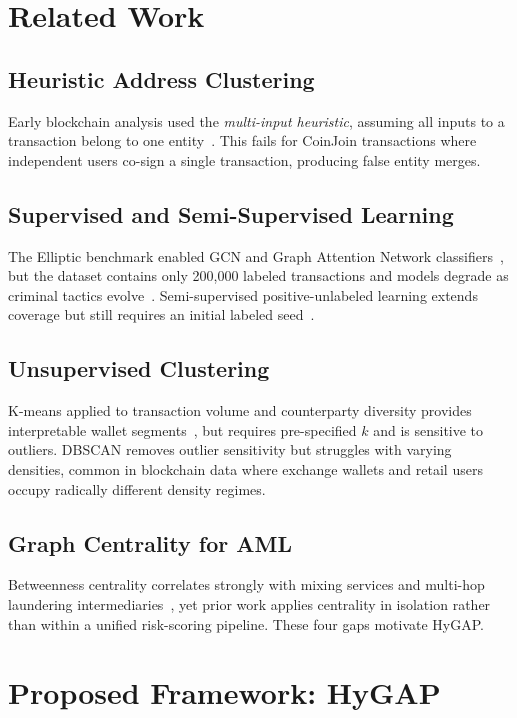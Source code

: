 \documentclass[conference]{IEEEtran}
\begin{document}
\section{Related Work}

\subsection{Heuristic Address Clustering}
Early blockchain analysis used the \emph{multi-input heuristic},
assuming all inputs to a transaction belong to one entity~\cite{b7}.
This fails for CoinJoin transactions where independent users
co-sign a single transaction, producing false entity merges.

\subsection{Supervised and Semi-Supervised Learning}
The Elliptic benchmark enabled GCN and Graph Attention Network
classifiers~\cite{b9}, but the dataset contains only 200{,}000
labeled transactions and models degrade as criminal tactics
evolve~\cite{b10}. Semi-supervised positive-unlabeled learning
extends coverage but still requires an initial labeled
seed~\cite{b5,b11}.

\subsection{Unsupervised Clustering}
K-means applied to transaction volume and counterparty diversity
provides interpretable wallet segments~\cite{b8}, but requires
pre-specified $k$ and is sensitive to outliers. DBSCAN removes
outlier sensitivity but struggles with varying densities, common
in blockchain data where exchange wallets and retail users
occupy radically different density regimes.

\subsection{Graph Centrality for AML}
Betweenness centrality correlates strongly with mixing services
and multi-hop laundering intermediaries~\cite{b12}, yet prior
work applies centrality in isolation rather than within a unified
risk-scoring pipeline. These four gaps motivate HyGAP.

\section{Proposed Framework: HyGAP}
\end{document}
